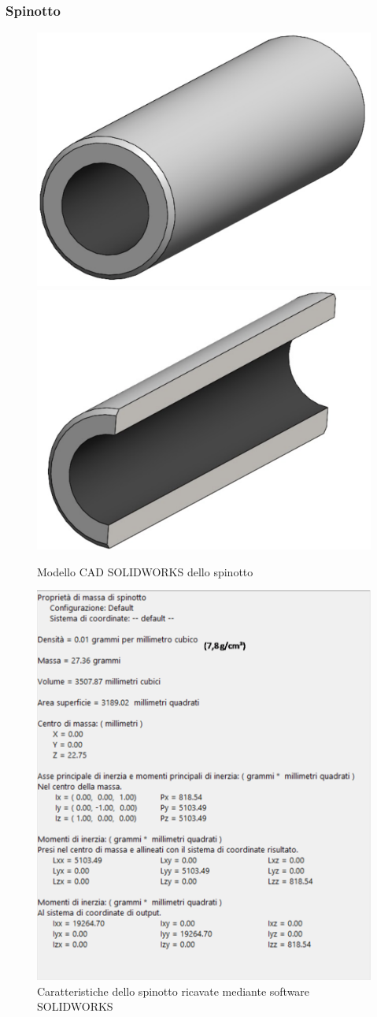 \subsubsection{Spinotto}
\begin{figure}[h]
\centering
   {\includegraphics[width=.35\textwidth]{Immagini/Spinotto1.png}} \quad
   {\includegraphics[width=.35\textwidth]{Immagini/Spinotto2.png}}
\caption{Modello CAD SOLIDWORKS dello spinotto}
\label{fig:Spinotto}
\end{figure}
\begin{figure}[h]
    \centering
    \includegraphics[scale=0.37]{Immagini/CaratteristicheSpinotto.png}
    \caption{Caratteristiche dello spinotto ricavate mediante software SOLIDWORKS}
    \label{fig:CaratteristicheSpinotto}
\end{figure}
\newpage
